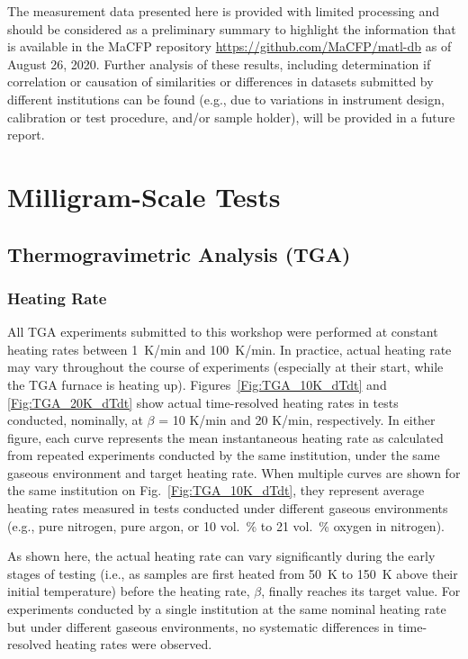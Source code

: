 \documentclass{book}
\begin{document}
The measurement data presented here is provided with limited processing and should be considered as a preliminary summary to highlight the information that is available in the MaCFP repository \href{https://github.com/MaCFP/matl-db}{https://github.com/MaCFP/matl-db} as of August 26, 2020. Further analysis of these results, including determination if correlation or causation of similarities or differences in datasets submitted by different institutions can be found (e.g., due to variations in instrument design, calibration or test procedure, and/or sample holder), will be provided in a future report.

\section{Milligram-Scale Tests}

\subsection{Thermogravimetric Analysis (TGA)}
\label{TGA_analysis}

\subsubsection{Heating Rate}

All TGA experiments submitted to this workshop were performed at constant heating rates between 1~K/min and 100~K/min. In practice, actual heating rate may vary throughout the course of experiments (especially at their start, while the TGA furnace is heating up). Figures~\ref{Fig:TGA_10K_dTdt} and \ref{Fig:TGA_20K_dTdt} show actual time-resolved heating rates in tests conducted, nominally, at $\beta$ = 10 K/min and 20 K/min, respectively. In either figure, each curve represents the mean instantaneous heating rate as calculated from repeated experiments conducted by the same institution, under the same gaseous environment and target heating rate. When multiple curves are shown for the same institution on Fig.~\ref{Fig:TGA_10K_dTdt}, they represent average heating rates measured in tests conducted under different gaseous environments (e.g., pure nitrogen, pure argon, or 10 vol.~\% to 21 vol.~\% oxygen in nitrogen).

As shown here, the actual heating rate can vary significantly during the early stages of testing (i.e., as samples are first heated from 50~K to 150~K above their initial temperature) before the heating rate, $\beta$, finally reaches its target value. For experiments conducted by a single institution at the same nominal heating rate but under different gaseous environments, no systematic differences in time-resolved heating rates were observed.
\end{document}
